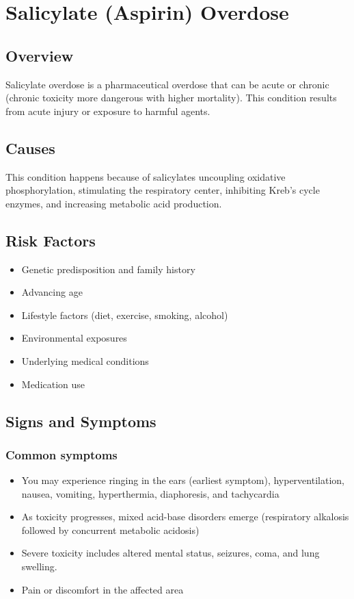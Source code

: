 \chapter{Salicylate (Aspirin) Overdose}
\label{sec:Salicylate Overdose}

\section{Overview}
Salicylate overdose is a pharmaceutical overdose that can be acute or chronic (chronic toxicity more dangerous with higher mortality). This condition results from acute injury or exposure to harmful agents.
\section{Causes}
This condition happens because of salicylates uncoupling oxidative phosphorylation, stimulating the respiratory center, inhibiting Kreb's cycle enzymes, and increasing metabolic acid production.     
\section{Risk Factors}

\begin{itemize}[noitemsep]
  \item Genetic predisposition and family history
  \item Advancing age
  \item Lifestyle factors (diet, exercise, smoking, alcohol)
  \item Environmental exposures
  \item Underlying medical conditions
  \item Medication use
\end{itemize}
\section{Signs and Symptoms}

\subsection{Common symptoms}
\begin{itemize}[noitemsep]
  \item You may experience ringing in the ears (earliest symptom), hyperventilation, nausea, vomiting, hyperthermia, diaphoresis, and tachycardia
  \item As toxicity progresses, mixed acid-base disorders emerge (respiratory alkalosis followed by concurrent metabolic acidosis)
  \item Severe toxicity includes altered mental status, seizures, coma, and lung swelling.
  \item Pain or discomfort in the affected area
  \end{itemize}


